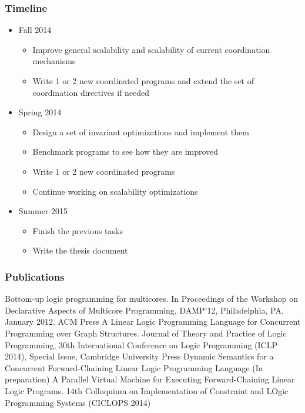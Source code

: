 \documentclass{beamer}
\begin{document}
\begin{frame}[fragile]
   \frametitle{Timeline}
   \begin{itemize}
      \item Fall 2014
      \begin{itemize}
         \item Improve general scalability and scalability of current coordination mechanisms
         \item Write 1 or 2 new coordinated programs and extend the set of coordination directives if needed
      \end{itemize}
      \item Spring 2014
      \begin{itemize}
         \item Design a set of invariant optimizations and implement them
         \item Benchmark programs to see how they are improved
         \item Write 1 or 2 new coordinated programs
         \item Continue working on scalability optimizations
      \end{itemize}
      \item Summer 2015
      \begin{itemize}
         \item Finish the previous tasks
         \item Write the thesis document
      \end{itemize}
   \end{itemize}
\end{frame}

\begin{frame}[fragile]
   \frametitle{Publications}
   \begin{thebibliography}{9}
       Bottom-up logic programming for multicores. In Proceedings of the Workshop on Declarative Aspects of Multicore Programming, DAMP'12, Philadelphia, PA, January 2012. ACM Press
      A Linear Logic Programming Language for Concurrent Programming over Graph Structures. Journal of Theory and Practice of Logic Programming, 30th International Conference on Logic Programming (ICLP 2014), Special Issue, Cambridge University Press
       Dynamic Semantics for a Concurrent Forward-Chaining Linear Logic Programming Language (In preparation)
       A Parallel Virtual Machine for Executing Forward-Chaining Linear Logic Programs. 14th Colloquium on Implementation of Constraint and LOgic Programming Systems (CICLOPS 2014)
   \end{thebibliography}
   
\end{frame}
\end{document}
